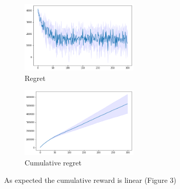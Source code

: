 \begin{multicols}{2}
    \begin{figure}[H]
        \begin{center}
        \includegraphics[width=0.5\textwidth]{img/regret2.png}
        \caption{Regret}
        \label{fig:regret2}
        \end{center}
    \end{figure}
    \columnbreak
    \begin{figure}[H]
        \begin{center}
        \includegraphics[width=0.5\textwidth]{img/cum_regret2.png}
        \caption{Cumulative regret}
        \label{fig:cum_reg2}
        \end{center}
    \end{figure}
\end{multicols}
As expected the cumulative reward is linear (Figure 3)
